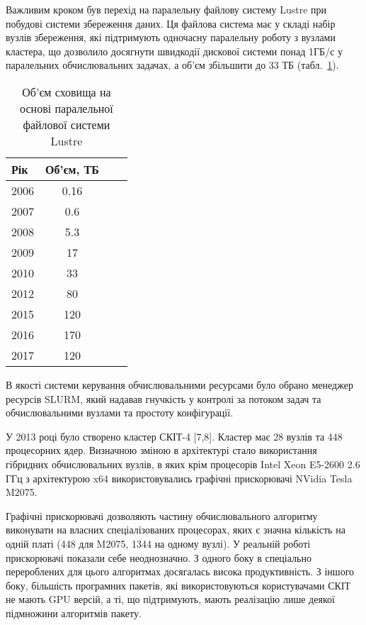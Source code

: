 Важливим кроком був перехід на паралельну файлову систему Lustre при побудові системи збереження даних. Ця файлова система має у складі набір вузлів збереження, які підтримують одночасну паралельну роботу з вузлами кластера, що дозволило досягнути швидкодії дискової системи понад 1ГБ/с у паралельних обчислювальних задачах, а об'єм збільшити до 33 ТБ (табл.~\ref{tab:storage}).


\begin{table}[htb]
  \begin{center}
    \caption{Об'єм сховища на основі паралельної файлової системи Lustre}
    \begin{tabular}{|l|c|c|c|}
      \hline
Рік & Об’єм, ТБ \\
      \hline
2006 & 0.16 \\
2007 & 0.6 \\
2008 & 5.3 \\
2009 & 17 \\
2010 & 33 \\
2012 & 80 \\
2015 & 120 \\
2016 & 170 \\
2017 & 120 \\
\hline
    \end{tabular}
    \label{tab:storage}
  \end{center}
\end{table}


В якості системи керування обчислювальними ресурсами було обрано менеджер ресурсів SLURM, який надавав гнучкість у контролі за потоком задач та обчислювальними вузлами та простоту конфігурації.

У 2013 році було створено кластер СКІТ-4 [7,8]. Кластер має 28 вузлів та 448 процесорних ядер. Визначною зміною в архітектурі стало використання гібридних обчислювальних вузлів, в яких крім  процесорів Intel Xeon E5-2600 2.6 ГГц з архітектурою x64 використовувались графічні прискорювачі NVidia Tesla M2075. 

Графічні прискорювачі дозволяють частину обчислювального алгоритму виконувати на власних спеціалізованих процесорах, яких є значна кількість на одній платі (448 для M2075, 1344 на одному вузлі). У реальній роботі прискорювачі показали себе неоднозначно. З одного боку в спеціально перероблених для цього алгоритмах досягалась висока продуктивність. З іншого боку, більшість програмних пакетів, які використовуються користувачами СКІТ не мають GPU версій, а ті, що підтримують, мають реалізацію лише деякої підмножини алгоритмів пакету. 

